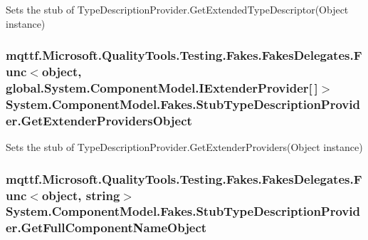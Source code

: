 Sets the stub of Type\-Description\-Provider.\-Get\-Extended\-Type\-Descriptor(\-Object instance)

\hypertarget{class_system_1_1_component_model_1_1_fakes_1_1_stub_type_description_provider_a1b54cdafc4aa99cd758ae1faa5179839}{
\subsubsection[{Get\-Extender\-Providers\-Object}]{\setlength{\rightskip}{0pt plus 5cm}mqttf.\-Microsoft.\-Quality\-Tools.\-Testing.\-Fakes.\-Fakes\-Delegates.\-Func$<$object, global.\-System.\-Component\-Model.\-I\-Extender\-Provider\mbox{[}$\,$\mbox{]}$>$ System.\-Component\-Model.\-Fakes.\-Stub\-Type\-Description\-Provider.\-Get\-Extender\-Providers\-Object}}\label{class_system_1_1_component_model_1_1_fakes_1_1_stub_type_description_provider_a1b54cdafc4aa99cd758ae1faa5179839}


Sets the stub of Type\-Description\-Provider.\-Get\-Extender\-Providers(\-Object instance)

\hypertarget{class_system_1_1_component_model_1_1_fakes_1_1_stub_type_description_provider_a1c419565a320a5ff36751fa9bf1b18f0}{
\subsubsection[{Get\-Full\-Component\-Name\-Object}]{\setlength{\rightskip}{0pt plus 5cm}mqttf.\-Microsoft.\-Quality\-Tools.\-Testing.\-Fakes.\-Fakes\-Delegates.\-Func$<$object, string$>$ System.\-Component\-Model.\-Fakes.\-Stub\-Type\-Description\-Provider.\-Get\-Full\-Component\-Name\-Object}}\label{class_system_1_1_component_model_1_1_fakes_1_1_stub_type_description_provider_a1c419565a320a5ff36751fa9bf1b18f0}


